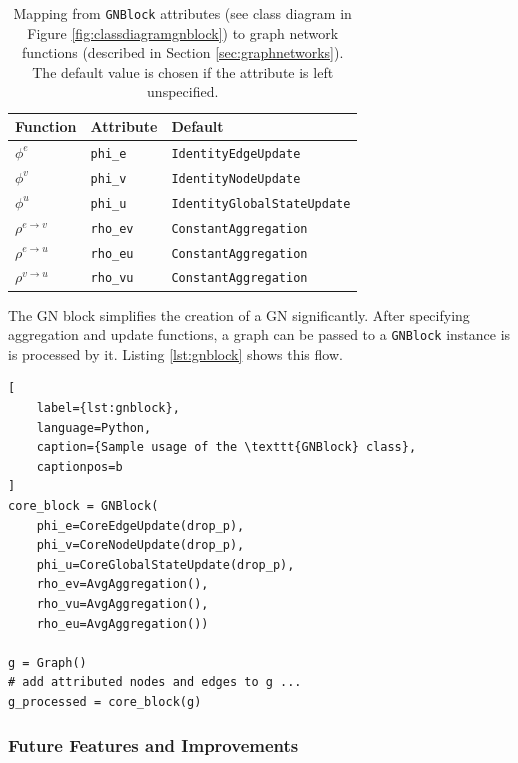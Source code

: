 \begin{table}
    \centering
    \begin{tabular}{ l l l }
        \hline
        \textbf{Function} & \textbf{Attribute} & \textbf{Default}\\
        \hline
        $\phi^e$ & \texttt{phi\_e} & \texttt{IdentityEdgeUpdate} \\
        $\phi^v$ & \texttt{phi\_v} & \texttt{IdentityNodeUpdate} \\
        $\phi^u$ & \texttt{phi\_u} & \texttt{IdentityGlobalStateUpdate} \\
        $\rho^{e\rightarrow v}$ & \texttt{rho\_ev} & \texttt{ConstantAggregation} \\
        $\rho^{e\rightarrow u}$ & \texttt{rho\_eu} & \texttt{ConstantAggregation} \\
        $\rho^{v\rightarrow u}$ & \texttt{rho\_vu} & \texttt{ConstantAggregation} \\
        \hline
    \end{tabular}
    \caption[Mapping from \texttt{GNBlock} attributes to graph network functions]{Mapping from \texttt{GNBlock} attributes (see class diagram in Figure \ref{fig:classdiagramgnblock}) to graph network functions (described in Section \ref{sec:graphnetworks}). The default value is chosen if the attribute is left unspecified.}
    \label{tab:gnblockattrs}
\end{table}

The GN block simplifies the creation of a GN significantly. After specifying aggregation and update functions, a graph can be passed to a \texttt{GNBlock} instance is is processed by it. Listing \ref{lst:gnblock} shows this flow.

\begin{lstlisting}[
    label={lst:gnblock},
    language=Python,
    caption={Sample usage of the \texttt{GNBlock} class},
    captionpos=b
]
core_block = GNBlock(
    phi_e=CoreEdgeUpdate(drop_p),
    phi_v=CoreNodeUpdate(drop_p),
    phi_u=CoreGlobalStateUpdate(drop_p),
    rho_ev=AvgAggregation(),
    rho_vu=AvgAggregation(),
    rho_eu=AvgAggregation())

g = Graph()
# add attributed nodes and edges to g ...
g_processed = core_block(g)
\end{lstlisting}

\subsubsection{Future Features and Improvements}

